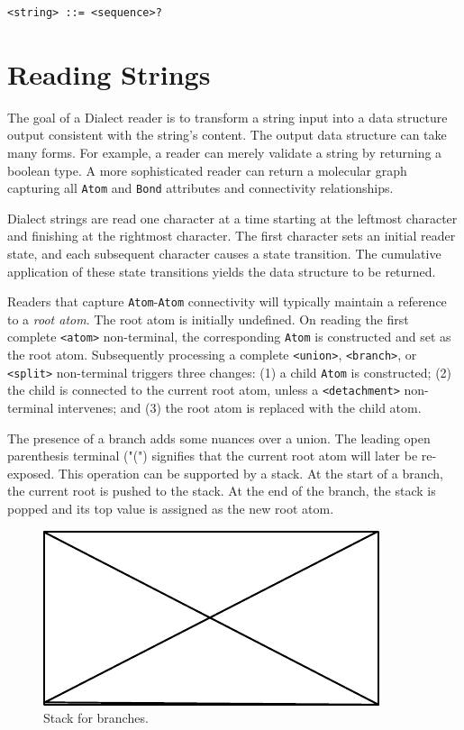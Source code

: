 \documentclass{article}
\def\ttt{\texttt}
\begin{document}
\begin{lstlisting}
<string> ::= <sequence>?
\end{lstlisting}

\section*{Reading Strings}

The goal of a Dialect reader is to transform a string input into a data structure output consistent with the string's content. The output data structure can take many forms. For example, a reader can merely validate a string by returning a boolean type. A more sophisticated reader can return a molecular graph capturing all \ttt{Atom} and \ttt{Bond} attributes and connectivity relationships.

Dialect strings are read one character at a time starting at the leftmost character and finishing at the rightmost character. The first character sets an initial reader state, and each subsequent character causes a state transition. The cumulative application of these state transitions yields the data structure to be returned.

Readers that capture \ttt{Atom}-\ttt{Atom} connectivity will typically maintain a reference to a \textit{root atom}. The root atom is initially undefined. On reading the first complete \ttt{<atom>} non-terminal, the corresponding \ttt{Atom} is constructed and set as the root atom. Subsequently processing a complete \ttt{<union>}, \ttt{<branch>}, or \ttt{<split>} non-terminal triggers three changes: (1) a child \ttt{Atom} is constructed; (2) the child is connected to the current root atom, unless a \ttt{<detachment>} non-terminal intervenes; and (3) the root atom is replaced with the child atom.

The presence of a branch adds some nuances over a union. The leading open parenthesis terminal ("(") signifies that the current root atom will later be re-exposed. This operation can be supported by a stack. At the start of a branch, the current root is pushed to the stack. At the end of the branch, the stack is popped and its top value is assigned as the new root atom.

\begin{figure}
    \centering
    \includegraphics{filler}
    \caption{Stack for branches.}
    \label{fig:branches-stack}
\end{figure}
\end{document}
